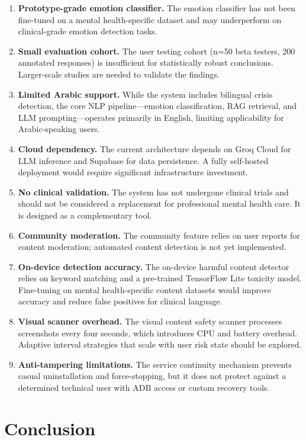 \documentclass[12pt,a4paper,oneside,openany]{report}
\begin{document}
\begin{enumerate}[nosep]
\item \textbf{Prototype-grade emotion classifier.} The emotion classifier has not been fine-tuned on a mental health-specific dataset and may underperform on clinical-grade emotion detection tasks.
\item \textbf{Small evaluation cohort.} The user testing cohort (n=50 beta testers, 200 annotated responses) is insufficient for statistically robust conclusions. Larger-scale studies are needed to validate the findings.
\item \textbf{Limited Arabic support.} While the system includes bilingual crisis detection, the core NLP pipeline---emotion classification, RAG retrieval, and LLM prompting---operates primarily in English, limiting applicability for Arabic-speaking users.
\item \textbf{Cloud dependency.} The current architecture depends on Groq Cloud for LLM inference and Supabase for data persistence. A fully self-hosted deployment would require significant infrastructure investment.
\item \textbf{No clinical validation.} The system has not undergone clinical trials and should not be considered a replacement for professional mental health care. It is designed as a complementary tool.
\item \textbf{Community moderation.} The community feature relies on user reports for content moderation; automated content detection is not yet implemented.
\item \textbf{On-device detection accuracy.} The on-device harmful content detector relies on keyword matching and a pre-trained TensorFlow Lite toxicity model. Fine-tuning on mental health-specific content datasets would improve accuracy and reduce false positives for clinical language.
\item \textbf{Visual scanner overhead.} The visual content safety scanner processes screenshots every four seconds, which introduces CPU and battery overhead. Adaptive interval strategies that scale with user risk state should be explored.
\item \textbf{Anti-tampering limitations.} The service continuity mechanism prevents casual uninstallation and force-stopping, but it does not protect against a determined technical user with ADB access or custom recovery tools.
\end{enumerate}

\section{Conclusion}
\end{document}
